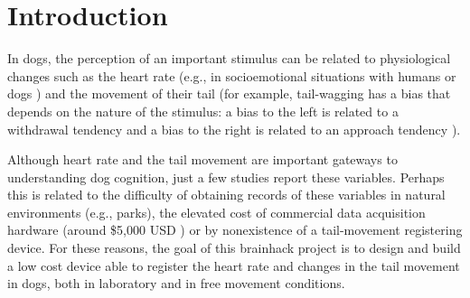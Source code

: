 \documentclass[twocolumn]{bmcart}%
\begin{document}
\begin{frontmatter}
\begin{fmbox}










%
\end{fmbox}%

\end{frontmatter}


\section{Introduction}\label{introduction}

In dogs, the perception of an important stimulus can be related to
physiological changes such as the heart rate (e.g., in socioemotional
situations with humans \cite{Palestrini200575} or dogs
\cite{Siniscalchi20132279} ) and the movement of their tail (for example,
tail-wagging has a bias that depends on the nature of the stimulus: a
bias to the left is related to a withdrawal tendency and a bias to the
right is related to an approach tendency \cite{Quaranta2007R199} ).

Although heart rate and the tail movement are important gateways to
understanding dog cognition, just a few studies report these variables.
Perhaps this is related to the difficulty of obtaining records of these
variables in natural environments (e.g., parks), the elevated cost of
commercial data acquisition hardware (around \$5,000 USD
\cite{paragonURL} ) or by nonexistence of a tail-movement registering
device. For these reasons, the goal of this brainhack project is to
design and build a low cost device able to register the heart rate and
changes in the tail movement in dogs, both in laboratory and in free
movement conditions.
\end{document}
